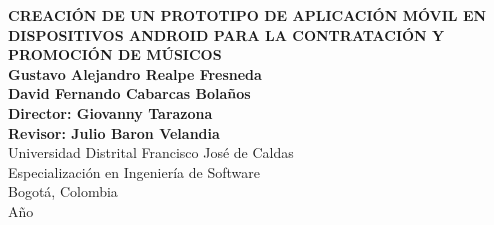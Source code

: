 \begin{center}
\begin{figure}
\centering%
%
\end{figure}
\thispagestyle{empty}  \textbf{ \LARGE
CREACIÓN DE UN PROTOTIPO DE APLICACIÓN MÓVIL EN 
DISPOSITIVOS ANDROID PARA LA CONTRATACIÓN Y PROMOCIÓN DE MÚSICOS 
}\\[2cm]
\Large\textbf{Gustavo Alejandro Realpe Fresneda}\\
\Large\textbf{David Fernando Cabarcas Bolaños}\\[2.0cm]

\large\textbf{Director: Giovanny Tarazona}\\
\large\textbf{Revisor: Julio Baron Velandia}\\[3.5cm]


\small Universidad Distrital Francisco Jos\'{e} de Caldas\\
Especialización en Ingeniería de Software\\
Bogotá, Colombia\\
A\~{n}o \the\year\\
\end{center}
